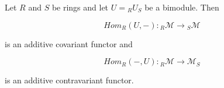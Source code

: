 Let $R$ and $S$ be rings and let $U = {}_R U_S$ be a bimodule. Then

$$Hom_R(U, -): {}_R\mathcal{M} \to {}_S\mathcal{M}$$

is an additive covariant functor and

$$Hom_R(-, U): {}_R\mathcal{M} \to \mathcal{M}_S$$

is an additive contravariant functor.
